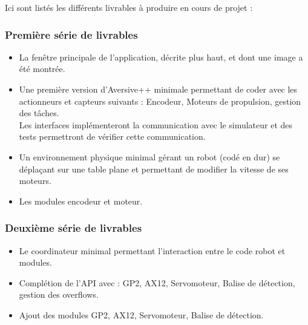 Ici sont listés les différents livrables à produire en cours de projet :

    \subsubsection{Première série de livrables}
    \begin{itemize}
    
        \item{La fenêtre principale de l'application, décrite plus haut, et dont une image a été montrée.}
        
        \item{Une première version d'Aversive++ minimale permettant de coder avec les actionneurs et capteurs suivants : Encodeur, Moteurs de propulsion, gestion des tâches.\\ Les interfaces implémenteront la communication avec le simulateur et des tests permettront de vérifier cette communication.}

        \item{Un environnement physique minimal gérant un robot (codé en dur) se déplaçant sur une table plane et permettant de modifier la vitesse de ses moteurs.}
        
        \item{Les modules encodeur et moteur.}
        
    \end{itemize}
    \subsubsection{Deuxième série de livrables}
    \begin{itemize}
        
        \item{Le coordinateur minimal permettant l'interaction entre le code robot et modules.}
        
        \item{Complétion de l'API avec : GP2, AX12, Servomoteur, Balise de détection, gestion des overflows.}
        
        \item{Ajout des modules GP2, AX12, Servomoteur, Balise de détection.}
        
    \end{itemize}
